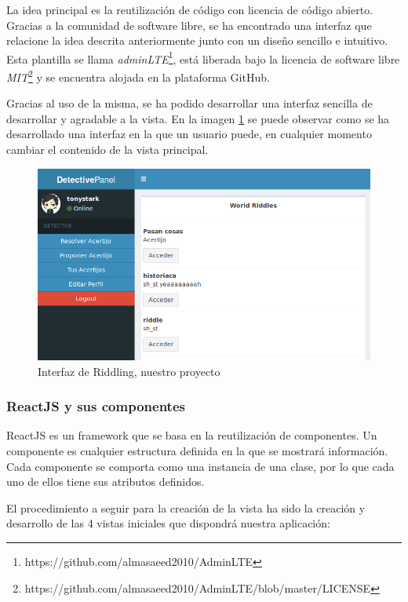 La idea principal es la reutilización de código con licencia de código abierto. Gracias a la comunidad de software libre, se ha encontrado una interfaz que relacione la idea descrita anteriormente junto con un diseño sencillo e intuitivo. Esta plantilla se llama \textit{adminLTE}\footnote{https://github.com/almasaeed2010/AdminLTE}, está liberada bajo la licencia de software libre \textit{MIT}\footnote{https://github.com/almasaeed2010/AdminLTE/blob/master/LICENSE} y se encuentra alojada en la plataforma GitHub.

Gracias al uso de la misma, se ha podido desarrollar una interfaz sencilla de desarrollar y agradable a la vista. En la imagen \ref{fig::rid} se puede observar como se ha desarrollado una interfaz en la que un usuario puede, en cualquier momento cambiar el contenido de la vista principal.

\begin{figure}[htbp]
    \centerline{\includegraphics[width=12cm]{figuras/riddling.png}}
    \caption{Interfaz de Riddling, nuestro proyecto}
    \label{fig::rid}
\end{figure}

\subsubsection{ReactJS y sus componentes}

ReactJS es un framework que se basa en la reutilización de componentes. Un componente es cualquier estructura definida en la que se mostrará información. Cada componente se comporta como una instancia de una clase, por lo que cada uno de ellos tiene sus atributos definidos.

El procedimiento a seguir para la creación de la vista ha sido la creación y desarrollo de las 4 vistas iniciales que dispondrá nuestra aplicación:

